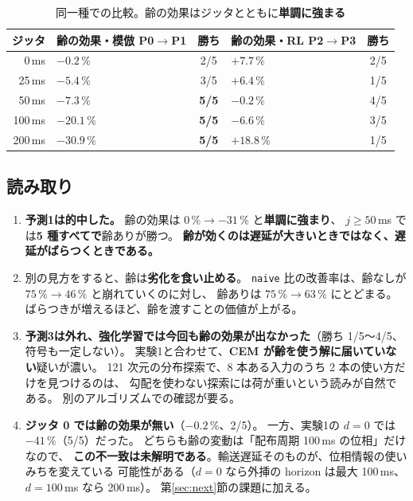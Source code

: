 \documentclass[11pt,a4paper]{article}
\newcommand{\code}[1]{\texttt{#1}}
\newcommand{\prob}[1]{\textbf{\textcolor{red!55!black}{#1}}}
\newcommand{\keyp}[1]{\textbf{\textcolor{blue!45!black}{#1}}}
\begin{document}
\begin{table}[htbp]
\centering
\small
\caption{同一種での比較。齢の効果はジッタとともに\keyp{単調に強まる}}
\label{tab:paired2}
\begin{tabular}{@{}r l c l c@{}}
\toprule
\textbf{ジッタ} & \textbf{齢の効果・模倣 P0$\to$P1} & \textbf{勝ち} &
\textbf{齢の効果・RL P2$\to$P3} & \textbf{勝ち} \\
\midrule
0\,ms   & $-0.2\,\%$ & 2/5 & $+7.7\,\%$ & 2/5 \\
25\,ms  & $-5.4\,\%$  & 3/5 & $+6.4\,\%$ & 1/5 \\
50\,ms  & $-7.3\,\%$ & \keyp{5/5} & $-0.2\,\%$ & 4/5 \\
100\,ms & $-20.1\,\%$ & \keyp{5/5} & $-6.6\,\%$ & 3/5 \\
200\,ms & \keyp{$-30.9\,\%$} & \keyp{5/5} & $+18.8\,\%$ & 1/5 \\
\bottomrule
\end{tabular}
\end{table}

\subsection{読み取り}

\begin{enumerate}[leftmargin=1.8em,itemsep=4pt]
  \item \keyp{予測1は的中した。} 齢の効果は $0\,\% \to -31\,\%$ と\keyp{単調に強まり}、
        $j\ge 50$\,ms では\keyp{5 種すべてで}齢ありが勝つ。
        \prob{齢が効くのは遅延が大きいときではなく、遅延がばらつくときである。}
  \item 別の見方をすると、齢は\keyp{劣化を食い止める}。
        \code{naive} 比の改善率は、齢なしが $75\,\% \to 46\,\%$ と崩れていくのに対し、
        齢ありは $75\,\% \to 63\,\%$ にとどまる。
        ばらつきが増えるほど、齢を渡すことの価値が上がる。
  \item \prob{予測3は外れ、強化学習では今回も齢の効果が出なかった}（勝ち 1/5〜4/5、符号も一定しない）。
        実験1と合わせて、\keyp{CEM が齢を使う解に届いていない}疑いが濃い。
        121 次元の分布探索で、8 本ある入力のうち 2 本の使い方だけを見つけるのは、
        勾配を使わない探索には荷が重いという読みが自然である。
        別のアルゴリズムでの確認が要る。
  \item \keyp{ジッタ 0 では齢の効果が無い}（$-0.2\,\%$、2/5）。
        一方、実験1の $d=0$ では $-41\,\%$（5/5）だった。
        どちらも齢の変動は「配布周期 100\,ms の位相」だけなので、
        \prob{この不一致は未解明である}。輸送遅延そのものが、位相情報の使いみちを変えている
        可能性がある（$d=0$ なら外挿の horizon は最大 100\,ms、$d=100$\,ms なら 200\,ms）。
        第\ref{sec:next}節の課題に加える。
\end{enumerate}
\end{document}
